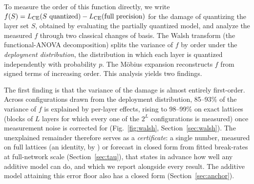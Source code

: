 To measure the order of this function directly, we write
$f(S) = L_{\mathrm{CE}}(S\ \text{quantized}) - L_{\mathrm{CE}}(\text{full precision})$ for the damage of quantizing the layer set
$S$, obtained by evaluating the partially quantized model, and analyze the measured $f$ through two
classical changes of basis. The Walsh transform (the functional-ANOVA decomposition) splits the variance
of $f$ by order under the \emph{deployment distribution}, the distribution in which each layer is
quantized independently with probability $p$. The M\"obius expansion reconstructs $f$ from signed terms of
increasing order. This analysis yields two findings.

The first finding is that the variance of the damage is almost entirely first-order. Across configurations
drawn from the deployment distribution, 85--93\% of the variance of $f$ is explained by per-layer effects,
rising to 98--99\% on exact lattices (blocks of $L$ layers for which every one of the $2^L$ configurations
is measured) once measurement noise is corrected for (Fig.~\ref{fig:walsh}, Section~\ref{sec:walsh}). 
The unexplained remainder therefore serves as a \emph{certificate}: a single number, measured on full
lattices (an identity, by \thmone{}) or forecast in closed form from fitted break-rates at
full-network scale
(Section~\ref{sec:tau}), that states in advance
how well any additive model can do, and which we report alongside
every result. The additive model attaining this error floor also has a closed form
(Section~\ref{sec:anchor}).

